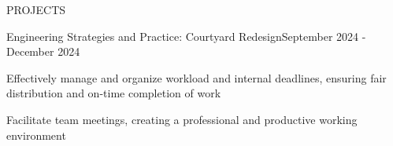 \documentclass{resume}
\begin{document}
\begin{rSection}{PROJECTS}

\begin{rSubsection}{Engineering Strategies and Practice: Courtyard Redesign}{September 2024 - December 2024}{}{}
\item Effectively manage and organize workload and internal deadlines, ensuring fair distribution and on-time completion of work
\item Facilitate team meetings, creating a professional and productive working environment
\end{rSubsection}

\end{rSection} 

\end{document}
